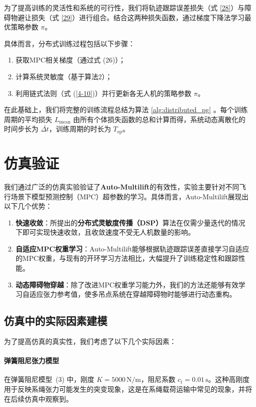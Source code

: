 \documentclass[lang=chs, degree=master, blindreview=false, winfonts=true]{yanputhesis}
\begin{document}
为了提高训练的灵活性和系统的可行性，我们将轨迹跟踪误差损失（式 \ref{28}）与障碍物避让损失（式 \ref{29}）进行组合。结合这两种损失函数，通过梯度下降法学习最优策略参数 $\pi$。

具体而言，分布式训练过程包括以下步骤：
\begin{enumerate}
    \item 获取MPC相关梯度（通过式 (26)）；
    \item 计算系统灵敏度（基于算法2）；
    \item 利用链式法则（式 (\ref{4-10})）并行更新各无人机的策略参数 $\pi$。
\end{enumerate}

在此基础上，我们将完整的训练流程总结为算法 \ref{alg:distributed_pg} 。每个训练周期的平均损失 $L_{\text{mean}}$ 由所有个体损失函数的总和计算而得，系统动态离散化的时间步长为 $\bar{\Delta t}$，训练周期的时长为 $T_{\text{ep}}$。


\section{仿真验证}
我们通过广泛的仿真实验验证了\textbf{Auto-Multilift}的有效性，实验主要针对不同飞行场景下模型预测控制（MPC）超参数的学习。具体而言，Auto-Multilift展现出以下几个优势：

\begin{enumerate}
    \item \textbf{快速收敛}：所提出的\textbf{分布式灵敏度传播（DSP）}算法在仅需少量迭代的情况下即可实现快速收敛，且收敛速度不受无人机数量的影响。  

    \item \textbf{自适应MPC权重学习}：Auto-Multilift能够根据轨迹跟踪误差直接学习自适应的MPC权重，与现有的开环学习方法相比，大幅提升了训练稳定性和跟踪性能。  

    \item \textbf{动态障碍物穿越}：除了改进MPC权重学习能力外，我们的方法还能够有效学习自适应张力参考值，使多吊点系统在穿越障碍物时能够进行动态重构。
\end{enumerate}

\subsection{仿真中的实际因素建模}

为了提高仿真的真实性，我们考虑了以下几个实际因素：

\paragraph{弹簧阻尼张力模型} 在弹簧阻尼模型~(3) 中，刚度 \( K = 5000 \, \text{N/m} \)，阻尼系数 \( c_t = 0.01 \, \text{s} \)。这种高刚度用于反映系绳张力可能发生的突变现象，这是在系绳载荷运输中常见的现象，并将在后续仿真中观察到。
\end{document}
